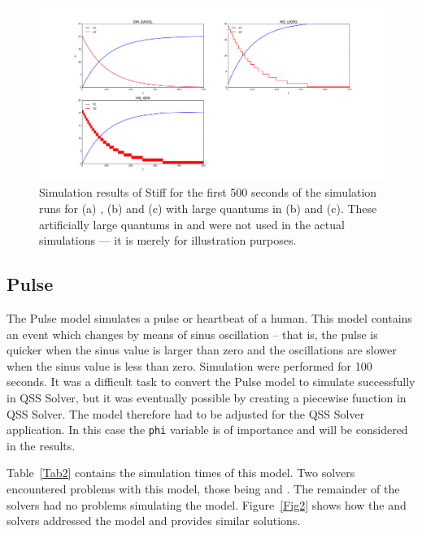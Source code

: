 \documentclass[10pt]{article}
\begin{document}
    \begin{figure}[htbp]
\begin{center}
\includegraphics[scale=0.32, clip,trim={55mm 15mm 55mm 20mm}]{./Figures/Model1.png}
\end{center}
\vspace{-0.5cm}
\caption{Simulation results of Stiff for the first 500 seconds of the simulation runs for (a) {}, (b) {} and (c) {} with large quantums in (b) and (c). These artificially large quantums in {} and   {} were not used in the actual simulations --- it is merely for illustration purposes.}\label{Fig1}
\end{figure}

\newpage

\phantom{2}

\newpage

\subsection{Pulse}

The Pulse model simulates a pulse or heartbeat of a human. This model contains an event which changes by means of sinus oscillation -- that is, the pulse is quicker when the sinus value is larger than zero and the oscillations are slower when the sinus value is less than zero. Simulation were performed for 100 seconds. It was a difficult task to convert the Pulse model to simulate successfully in QSS Solver, but it was eventually possible by creating a piecewise function in QSS Solver. The model therefore had to be adjusted for the QSS Solver application. In this case the {\tt{phi}} variable is of importance and will be considered in the results.

Table~\ref{Tab2} contains the simulation times of this model. Two solvers encountered problems with this model, those being {} and {}. The remainder of the solvers had no problems simulating the model. Figure~\ref{Fig2} shows how the {} and {} solvers addressed the model and provides similar solutions.
\end{document}
